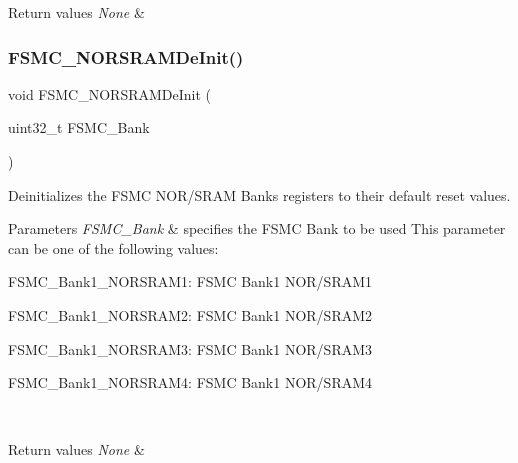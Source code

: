 \begin{DoxyRetVals}{Return values}
{\em None} & \\
\hline
\end{DoxyRetVals}
\mbox{\label{group___f_s_m_c___private___functions_gaab3e6648e8a584e73785361ac960eded}} 
\subsubsection{\texorpdfstring{FSMC\_NORSRAMDeInit()}{FSMC\_NORSRAMDeInit()}}
{\footnotesize\ttfamily void F\+S\+M\+C\+\_\+\+N\+O\+R\+S\+R\+A\+M\+De\+Init (\begin{DoxyParamCaption}\item[{uint32\+\_\+t}]{F\+S\+M\+C\+\_\+\+Bank }\end{DoxyParamCaption})}



Deinitializes the F\+S\+MC N\+O\+R/\+S\+R\+AM Banks registers to their default reset values. 


\begin{DoxyParams}{Parameters}
{\em F\+S\+M\+C\+\_\+\+Bank} & specifies the F\+S\+MC Bank to be used This parameter can be one of the following values\+: \begin{DoxyItemize}
\item F\+S\+M\+C\+\_\+\+Bank1\+\_\+\+N\+O\+R\+S\+R\+A\+M1\+: F\+S\+MC Bank1 N\+O\+R/\+S\+R\+A\+M1\end{DoxyItemize}
\begin{DoxyItemize}
\item F\+S\+M\+C\+\_\+\+Bank1\+\_\+\+N\+O\+R\+S\+R\+A\+M2\+: F\+S\+MC Bank1 N\+O\+R/\+S\+R\+A\+M2 \item F\+S\+M\+C\+\_\+\+Bank1\+\_\+\+N\+O\+R\+S\+R\+A\+M3\+: F\+S\+MC Bank1 N\+O\+R/\+S\+R\+A\+M3 \item F\+S\+M\+C\+\_\+\+Bank1\+\_\+\+N\+O\+R\+S\+R\+A\+M4\+: F\+S\+MC Bank1 N\+O\+R/\+S\+R\+A\+M4 \end{DoxyItemize}
\\
\hline
\end{DoxyParams}

\begin{DoxyRetVals}{Return values}
{\em None} & \\
\hline
\end{DoxyRetVals}
\mbox{\label{group___f_s_m_c___private___functions_ga9c27816e8b17394c9ee1ce9298917b4a}} 
